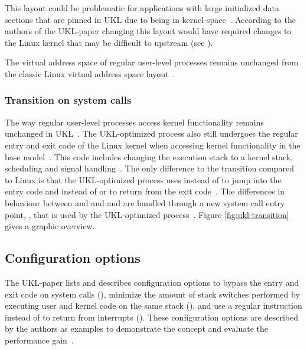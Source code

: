 \documentclass[10pt,twocolumn,a4paper]{article}
\begin{document}
      This layout could be problematic for applications with large initialized data sections
      that are pinned in UKL due to being in kernel-space~\cite{raza23}.
      According to the authors of the UKL-paper changing this layout would have required changes
      to the Linux kernel that may be difficult to upstream (see ).

      The virtual address space of regular user-level processes remains unchanged from
      the classic Linux virtual address space layout~\cite{raza23}.

    \subsubsection{Transition on system calls}\label{sec:transition}
      The way regular user-level processes access kernel functionality remains unchanged in UKL~\cite{raza23}.
      The UKL-optimized process also still undergoes the regular entry and exit code of
      the Linux kernel when accessing kernel functionality in the base model~\cite{raza23}.
      This code includes changing the execution stack to a kernel stack, scheduling and signal handling~\cite{raza23}.
      The only difference to the transition compared to Linux is that the UKL-optimized process uses
       instead of  to jump into the entry code and  instead
      of  or  to return from the exit code~\cite{ukl-glibc-syscalls}. 
      The differences in behaviour between  and  and 
       and  are handled through a new system call entry point, 
      , that is used by the UKL-optimized process~\cite{raza23}.
      Figure \ref{fig:ukl-transition} gives a graphic overview.

      \begin{figure*}[hbt]
        \centering
        
        \caption{Transition between applications and kernel in UKL base model}
        \label{fig:ukl-transition}
      \end{figure*}

  \subsection{Configuration options}\label{sec:configuration-options}
    The UKL-paper lists and describes configuration options to bypass the entry and exit code
    on system calls (), minimize the amount of stack switches performed 
    by executing user and kernel code on the same stack (),
    and use a regular  instruction instead of  to return from 
    interrupts ().
    These configuration options are described by the authors as examples to demonstrate the concept
    and evaluate the performance gain~\cite{raza23}.
\end{document}
